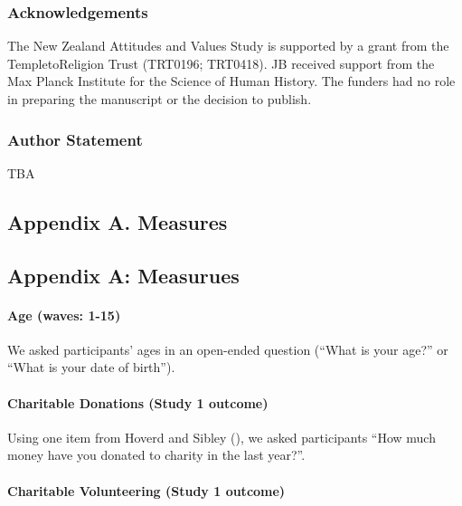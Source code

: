 \documentclass[
  singlecolumn]{article}
\let\oldparagraph\paragraph
\renewcommand{\paragraph}[1]{\oldparagraph{#1}\mbox{}}
\begin{document}
\subsubsection{Acknowledgements}\label{acknowledgements}

The New Zealand Attitudes and Values Study is supported by a grant from
the TempletoReligion Trust (TRT0196; TRT0418). JB received support from
the Max Planck Institute for the Science of Human History. The funders
had no role in preparing the manuscript or the decision to publish.

\subsubsection{Author Statement}\label{author-statement}

TBA

\newpage{}

\subsection{Appendix A. Measures}\label{appendix-a.-measures}

\subsection{Appendix A: Measurues}\label{appendix-measures}

\paragraph{Age (waves: 1-15)}\label{age-waves-1-15}

We asked participants' ages in an open-ended question (``What is your
age?'' or ``What is your date of birth'').

\paragraph{Charitable Donations (Study 1
outcome)}\label{charitable-donations-study-1-outcome}

Using one item from Hoverd and Sibley
(), we asked participants
``How much money have you donated to charity in the last year?''.

\paragraph{Charitable Volunteering (Study 1
outcome)}\label{charitable-volunteering-study-1-outcome}
\end{document}
